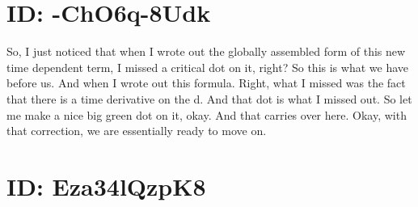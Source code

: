 \documentclass[10pt]{article}
\begin{document}
\section*{ID: -ChO6q-8Udk}
So, I just noticed that when I wrote out the globally assembled form of this new time dependent term, I missed a critical dot on it, right? So this is what we have before us. And when I wrote out this formula. Right, what I missed was the fact that there is a time derivative on the d. And that dot is what I missed out. So let me make a nice big green dot on it, okay. And that carries over here. Okay, with that correction, we are essentially ready to move on.

\section*{ID: Eza34lQzpK8}
\end{document}
